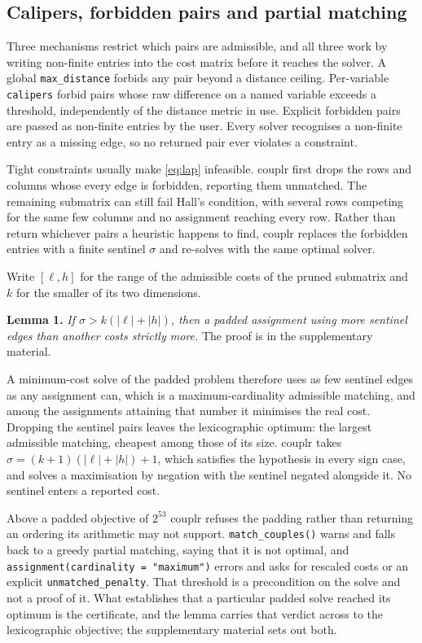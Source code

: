 \subsection{Calipers, forbidden pairs and partial matching}\label{calipers-forbidden-pairs-and-partial-matching}

Three mechanisms restrict which pairs are admissible, and all three work by
writing non-finite entries into the cost matrix before it reaches the solver.
A global \texttt{max\_distance} forbids any pair beyond a distance ceiling. Per-variable
\texttt{calipers} forbid pairs whose raw difference on a named variable exceeds a
threshold, independently of the distance metric in use. Explicit forbidden pairs
are passed as non-finite entries by the user. Every solver recognises a
non-finite entry as a missing edge, so no returned pair ever violates a
constraint.

Tight constraints usually make \eqref{eq:lap} infeasible. couplr first drops
the rows and columns whose every edge is forbidden, reporting them unmatched.
The remaining submatrix can still fail Hall's condition, with several rows
competing for the same few columns and no assignment reaching every row.
Rather than return whichever pairs a heuristic happens to find, couplr
replaces the forbidden entries with a finite sentinel \(\sigma\) and re-solves
with the same optimal solver.

Write \([\ell, h]\) for the range of the admissible costs of the pruned
submatrix and \(k\) for the smaller of its two dimensions.

\textbf{Lemma 1.} \emph{If \(\sigma > k(|\ell| + |h|)\), then a padded assignment using more
sentinel edges than another costs strictly more.} The proof is in the
supplementary material.

A minimum-cost solve of the padded problem therefore uses as few sentinel
edges as any assignment can, which is a maximum-cardinality admissible
matching, and among the assignments attaining that number it minimises the
real cost. Dropping the sentinel pairs leaves the lexicographic optimum: the
largest admissible matching, cheapest among those of its size. couplr takes
\(\sigma = (k+1)(|\ell| + |h|) + 1\), which satisfies the hypothesis in every
sign case, and solves a maximisation by negation with the sentinel negated
alongside it. No sentinel enters a reported cost.

Above a padded objective of \(2^{53}\) couplr refuses the padding rather than
returning an ordering its arithmetic may not support. \texttt{match\_couples()} warns
and falls back to a greedy partial matching, saying that it is not optimal,
and \texttt{assignment(cardinality\ =\ "maximum")} errors and asks for rescaled costs
or an explicit \texttt{unmatched\_penalty}. That threshold is a precondition on the
solve and not a proof of it. What establishes that a particular padded solve
reached its optimum is the certificate, and the lemma carries that verdict
across to the lexicographic objective; the supplementary material sets out
both.

